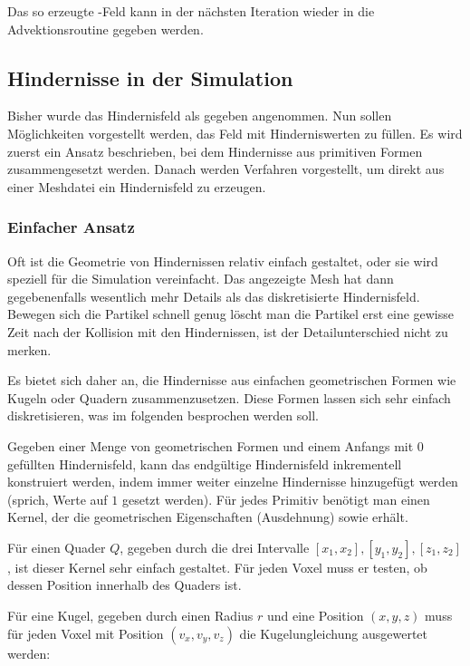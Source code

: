 Das so erzeugte -Feld kann in der nächsten
Iteration wieder in die Advektionsroutine gegeben werden.

\subsection{Hindernisse in der Simulation}
\label{sec:implementation_wind_boundaries}

Bisher wurde das Hindernisfeld  als
gegeben angenommen. Nun sollen Möglichkeiten vorgestellt werden, das
Feld mit Hinderniswerten zu füllen. Es wird zuerst ein Ansatz
beschrieben, bei dem Hindernisse aus primitiven Formen zusammengesetzt
werden. Danach werden Verfahren vorgestellt, um direkt aus einer
Meshdatei ein Hindernisfeld zu erzeugen.

\subsubsection{Einfacher Ansatz}

Oft ist die Geometrie von Hindernissen relativ einfach gestaltet, oder
sie wird speziell für die Simulation vereinfacht. Das angezeigte Mesh
hat dann gegebenenfalls wesentlich mehr Details als das diskretisierte
Hindernisfeld. Bewegen sich die Partikel schnell genug \Pimiddybzw
löscht man die Partikel erst eine gewisse Zeit nach der Kollision mit
den Hindernissen, ist der Detailunterschied nicht zu merken.

Es bietet sich daher an, die Hindernisse aus einfachen geometrischen
Formen wie Kugeln oder Quadern zusammenzusetzen. Diese Formen lassen
sich sehr einfach diskretisieren, was im folgenden besprochen werden soll.

Gegeben einer Menge von geometrischen Formen und einem Anfangs mit $0$
gefüllten Hindernisfeld, kann das endgültige Hindernisfeld
inkrementell konstruiert werden, indem immer weiter einzelne
Hindernisse hinzugefügt werden (sprich, Werte auf $1$ gesetzt
werden). Für jedes Primitiv benötigt man einen Kernel, der die
geometrischen Eigenschaften (\PimiddyzB Ausdehnung) sowie
 erhält.

Für einen Quader $Q$, gegeben durch die drei Intervalle
$[x_1,x_2],[y_1,y_2],[z_1,z_2]$, ist dieser Kernel sehr einfach
gestaltet. Für jeden Voxel muss er testen, ob dessen Position
innerhalb des Quaders ist.

Für eine Kugel, gegeben durch einen Radius $r$ und eine Position
$(x,y,z)$ muss für jeden Voxel mit Position $(v_x,v_y,v_z)$ die
Kugelungleichung ausgewertet werden:

